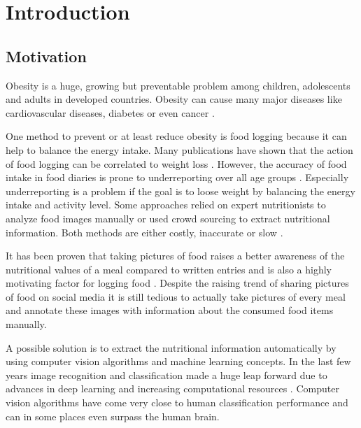 
\chapter{Introduction}
\label{chap:introduction}

\section{Motivation}
\label{sec:introduction_motivation}
Obesity is a huge, growing but preventable problem among children, adolescents and adults in developed countries. Obesity can cause many major diseases like cardiovascular diseases, diabetes or even cancer \cite{Ogden2010, WHO}.

One method to prevent or at least reduce obesity is food logging because it can help to balance the energy intake. Many publications have shown that the action of food logging can be correlated to weight loss \cite{Hollis2008, Burke2011, Svetkey2008}. However, the accuracy of food intake in food diaries is prone to underreporting over all age groups \cite{Livingstone2007}. Especially underreporting is a problem if the goal is to loose weight by balancing the energy intake and activity level. Some approaches relied on expert nutritionists to analyze food images manually or used crowd sourcing to extract nutritional information. Both methods are either costly, inaccurate or slow \cite{Meyers2015}.

It has been proven that taking pictures of food raises a better awareness of the nutritional values of a meal compared to written entries \cite{Zepeda2008} and is also a highly motivating factor for logging food \cite{Kim2010}. Despite the raising trend of sharing pictures of food on social media it is still tedious to actually take pictures of every meal and annotate these images with information about the consumed food items manually.

A possible solution is to extract the nutritional information automatically by using computer vision algorithms and machine learning concepts. In the last few years image recognition and classification made a huge leap forward due to advances in deep learning and increasing computational resources \cite{Szegedy2014}. Computer vision algorithms have come very close to human classification performance and can in some places even surpass the human brain.

